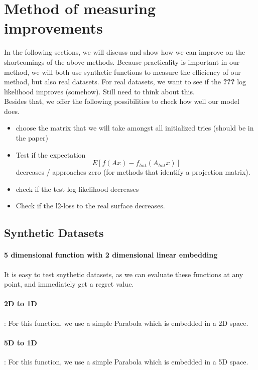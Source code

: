 \section{Method of measuring improvements}
In the following sections, we will discuss and show how we can improve on the shortcomings of the above methods.
Because practicality is important in our method, we will both use synthetic functions to measure the efficiency of our method, but also real datasets.
For real datasets, we want to see if the
\textbf{???} log likelihood improves (somehow).
Still need to think about this.\\

Besides that, we offer the following possibilities to check how well our model does.

\begin{itemize}
\item choose the matrix that we will take amongst all initialized tries (should be in the paper)
\item Test if the expectation $$ E[ f(A x) - f_{hat}(A_{hat} x) ] $$ decreases / approaches zero (for methods that identify a projection matrix).
\item check if the test log-likelihood decreases
\item Check if the l2-loss to the real surface decreases.
\end{itemize}



\subsection{Synthetic Datasets}
\paragraph{5 dimensional function with 2 dimensional linear embedding}

It is easy to test snythetic datasets, as we can evaluate these functions at any point, and immediately get a regret value.

\paragraph{2D to 1D}: For this function, we use a simple Parabola which is embedded in a 2D space.
\paragraph{5D to 1D}: For this function, we use a simple Parabola which is embedded in a 5D space.
